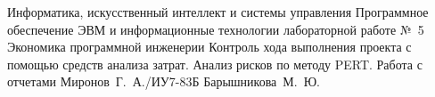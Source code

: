 \documentclass{bmstu}
\begin{document}
\makereporttitle
    {Информатика, искусственный интеллект и системы управления}
    {Программное обеспечение ЭВМ и информационные технологии}
    {лабораторной работе №~5}
    {Экономика программной инженерии}
    {Контроль хода выполнения проекта с помощью средств анализа затрат.
Анализ рисков по методу PERT. Работа с отчетами}
    {}
    {Миронов~Г.~А./ИУ7-83Б}
    {Барышникова~М.~Ю.}




\end{document}
